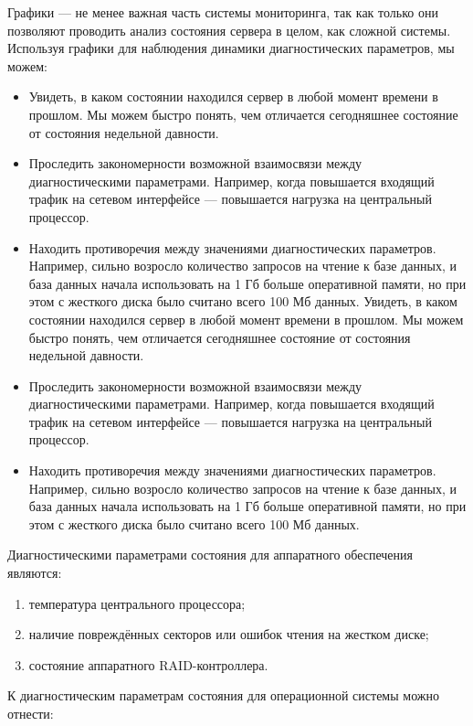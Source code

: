 \documentclass[10pt, a5paper]{article}
\begin{document}
Графики --- не менее важная часть системы мониторинга, так как только они позволяют проводить анализ состояния сервера в целом, как сложной системы. 
Используя графики для наблюдения динамики диагностических параметров, мы можем:
\begin{itemize}
	\item Увидеть, в каком состоянии находился сервер в любой момент времени в прошлом. Мы можем быстро понять, чем отличается сегодняшнее состояние от состояния недельной давности.
	\item Проследить закономерности возможной взаимосвязи между диагностическими параметрами. Например, когда повышается входящий трафик на сетевом интерфейсе --- повышается нагрузка на центральный процессор.
	\item Находить противоречия между значениями диагностических параметров. Например, сильно возросло количество запросов на чтение к базе данных, и база данных начала использовать на 1 Гб больше оперативной памяти, но при этом с жесткого диска было считано всего 100 Мб данных.
 Увидеть, в каком состоянии находился сервер в любой момент времени в прошлом. Мы можем быстро понять, чем отличается сегодняшнее состояние от состояния недельной давности.
	\item Проследить закономерности возможной взаимосвязи между диагностическими параметрами. Например, когда повышается входящий трафик на сетевом интерфейсе --- повышается нагрузка на центральный процессор.
	\item Находить противоречия между значениями диагностических параметров. Например, сильно возросло количество запросов на чтение к базе данных, и база данных начала использовать на 1 Гб больше оперативной памяти, но при этом с жесткого диска было считано всего 100 Мб данных.
\end{itemize}
Диагностическими параметрами состояния для аппаратного обеспечения являются: 
\begin{enumerate}
	\item температура центрального процессора;
	\item наличие повреждённых секторов или ошибок чтения на жестком диске;
	\item состояние аппаратного RAID-контроллера.
\end{enumerate}
К диагностическим параметрам состояния для операционной системы можно отнести:
\end{document}
